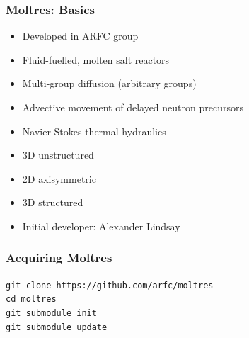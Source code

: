 \begin{frame}
        \frametitle{Moltres: Basics}
        \begin{itemize}  
                \item Developed in ARFC group
                \item Fluid-fuelled, molten salt reactors
                \item Multi-group diffusion (arbitrary groups)
                \item Advective movement of delayed neutron precursors
                \item Navier-Stokes thermal hydraulics
                \item 3D unstructured
                \item 2D axisymmetric
                \item 3D structured 
                \item Initial developer: Alexander Lindsay \cite{lindsay_introduction_2018}
        \end{itemize}
\end{frame}

\begin{frame}
        \frametitle{Acquiring Moltres}
             \texttt{git clone https://github.com/arfc/moltres}\\
        \texttt{cd moltres}\\
        \texttt{git submodule init}\\
        \texttt{git submodule update}\\
\end{frame}

